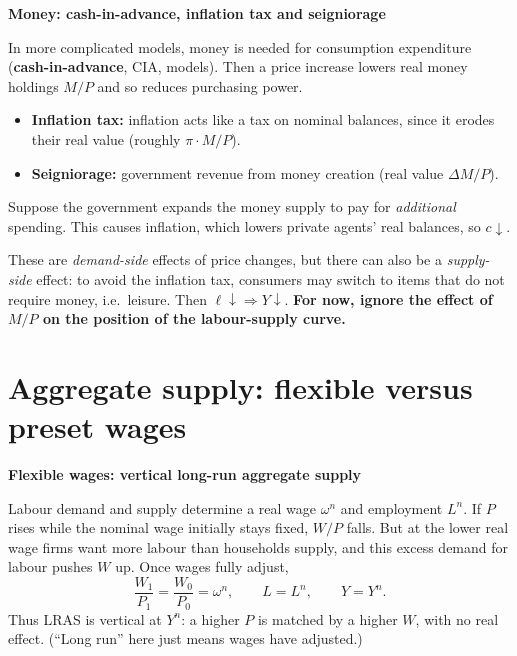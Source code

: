 \documentclass[11pt,letterpaper]{article}
\newcommand{\topic}[1]{\par\Needspace{4\baselineskip}\medskip\textbf{#1}\par\nobreak}
\newcommand{\w}{\omega}
\begin{document}
\topic{Money: cash-in-advance, inflation tax and seigniorage}
In more complicated models, money is needed for consumption expenditure
(\textbf{cash-in-advance}, CIA, models). Then a price increase lowers real money
holdings $M/P$ and so reduces purchasing power.
\begin{itemize}
 \item \textbf{Inflation tax:} inflation acts like a tax on nominal balances, since
 it erodes their real value (roughly $\pi\cdot M/P$).
 \item \textbf{Seigniorage:} government revenue from money creation (real value
 $\Delta M/P$).
\end{itemize}
Suppose the government expands the money supply to pay for \emph{additional}
spending. This causes inflation, which lowers private agents' real balances, so
$c\downarrow$.

These are \emph{demand-side} effects of price changes, but there can also be a
\emph{supply-side} effect: to avoid the inflation tax, consumers may switch to
items that do not require money, i.e.\ leisure. Then $\ell\downarrow\Rightarrow Y\downarrow$.
\textbf{For now, ignore the effect of $M/P$ on the position of the labour-supply curve.}

\newpage
\section{Aggregate supply: flexible versus preset wages}
\topic{Flexible wages: vertical long-run aggregate supply}
Labour demand and supply determine a real wage $\w^n$ and employment $L^n$.
If $P$ rises while the nominal wage initially stays fixed, $W/P$ falls. But at
the lower real wage firms want more labour than households supply, and this
excess demand for labour pushes $W$ up. Once wages fully adjust,
\[
 \frac{W_1}{P_1}=\frac{W_0}{P_0}=\w^n,\qquad
 L=L^n,\qquad Y=Y^n.
\]
Thus LRAS is vertical at $Y^n$: a higher $P$ is matched by a higher $W$, with no
real effect. (``Long run'' here just means wages have adjusted.)
\end{document}
